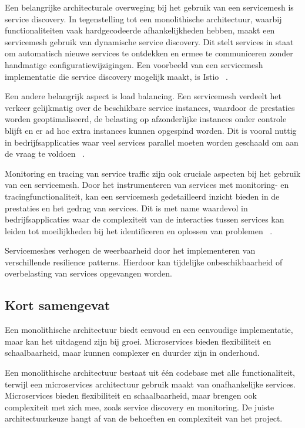 Een belangrijke architecturale overweging bij het gebruik van een servicemesh is service discovery. In tegenstelling tot een monolithische architectuur, waarbij functionaliteiten vaak hardgecodeerde afhankelijkheden hebben, maakt een servicemesh gebruik van dynamische service discovery. Dit stelt services in staat om automatisch nieuwe services te ontdekken en ermee te communiceren zonder handmatige configuratiewijzigingen. Een voorbeeld van een servicemesh implementatie die service discovery mogelijk maakt, is Istio ~\autocite{Morgan2021}.

Een andere belangrijk aspect is load balancing. Een servicemesh verdeelt het verkeer gelijkmatig over de beschikbare service instances, waardoor de prestaties worden geoptimaliseerd, de belasting op afzonderlijke instances onder controle blijft en er ad hoc extra instances kunnen opgespind worden. Dit is vooral nuttig in bedrijfsapplicaties waar veel services parallel moeten worden geschaald om aan de vraag te voldoen ~\autocite{Ciobotaru2020}.

Monitoring en tracing van service traffic zijn ook cruciale aspecten bij het gebruik van een servicemesh. Door het instrumenteren van services met monitoring- en tracingfunctionaliteit, kan een servicemesh gedetailleerd inzicht bieden in de prestaties en het gedrag van services. Dit is met name waardevol in bedrijfsapplicaties waar de complexiteit van de interacties tussen services kan leiden tot moeilijkheden bij het identificeren en oplossen van problemen \linebreak ~\autocite{Ciobotaru2021}.

Servicemeshes verhogen de weerbaarheid door het implementeren van verschillende resilience patterns. Hierdoor kan tijdelijke onbeschikbaarheid of overbelasting van services opgevangen worden.

\subsection*{Kort samengevat}

Een monolithische architectuur biedt eenvoud en een eenvoudige implementatie, maar kan het uitdagend zijn bij groei. Microservices bieden flexibiliteit en schaalbaarheid, maar kunnen complexer en duurder zijn in onderhoud.

Een monolithische architectuur bestaat uit één codebase met alle functionaliteit, terwijl een \linebreak microservices architectuur gebruik maakt van onafhankelijke services. Microservices bieden flexibiliteit en schaalbaarheid, maar brengen ook complexiteit met zich mee, zoals service discovery en monitoring. De juiste architectuurkeuze hangt af van de behoeften en complexiteit van het project.


